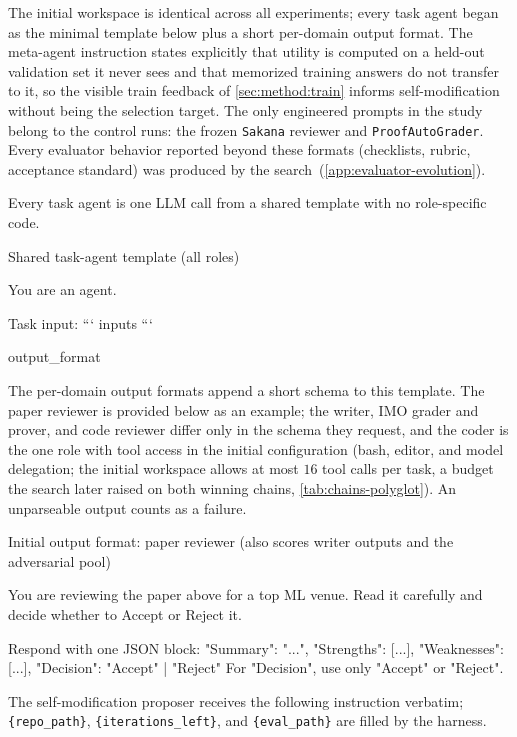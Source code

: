 \documentclass{paper}
\newcommand{\proofautograder}{\texttt{ProofAutoGrader}\xspace}
\newcommand{\sakana}{\texttt{Sakana}\xspace}
\begin{document}
The initial workspace is identical across all experiments; every task agent began as the minimal template below plus a short per-domain output format. The meta-agent instruction states explicitly that utility is computed on a held-out validation set it never sees and that memorized training answers do not transfer to it, so the visible train feedback of \cref{sec:method:train} informs self-modification without being the selection target. The only engineered prompts in the study belong to the control runs: the frozen \sakana reviewer and \proofautograder. Every evaluator behavior reported beyond these formats (checklists, rubric, acceptance standard) was produced by the search~(\cref{app:evaluator-evolution}).

Every task agent is one LLM call from a shared template with no role-specific code.

\begin{promptbox}{Shared task-agent template (all roles)}
\begin{PromptVerb}
You are an agent.

Task input:
```
{inputs}
```

{output_format}
\end{PromptVerb}
\end{promptbox}

The per-domain output formats append a short schema to this template. The paper reviewer is provided below as an example; the writer, IMO grader and prover, and code reviewer differ only in the schema they request, and the coder is the one role with tool access in the initial configuration (bash, editor, and model delegation; the initial workspace allows at most $16$ tool calls per task, a budget the search later raised on both winning chains, \cref{tab:chains-polyglot}). An unparseable output counts as a failure.

\begin{promptbox}{Initial output format: paper reviewer (also scores writer outputs and the adversarial pool)}
\begin{PromptVerb}
You are reviewing the paper above for a top ML venue. Read it carefully
and decide whether to Accept or Reject it.

Respond with one JSON block:
{
  "Summary": "...", "Strengths": [...], "Weaknesses": [...],
  "Decision": "Accept" | "Reject"
}
For "Decision", use only "Accept" or "Reject".
\end{PromptVerb}
\end{promptbox}


The self-modification proposer receives the following instruction verbatim; \texttt{\{repo\_path\}}, \texttt{\{iterations\_left\}}, and \texttt{\{eval\_path\}} are filled by the harness.
\end{document}
